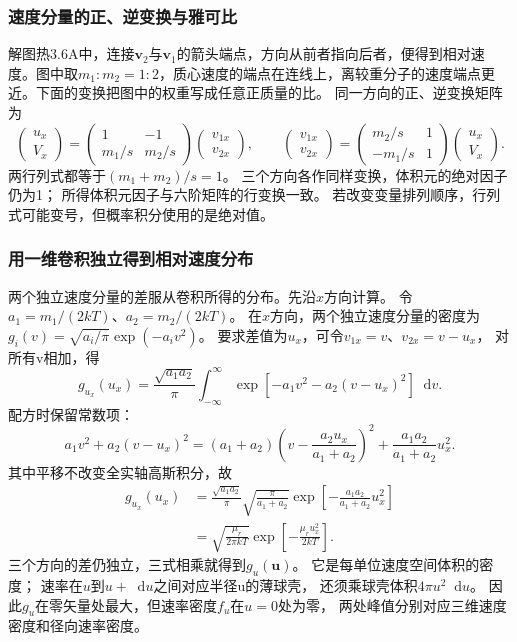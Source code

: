 \documentclass[UTF8,fontset=fandol,a4paper,11pt]{ctexart}
\newcommand{\dd}{\mathop{}\!\mathrm{d}}
\begin{document}
\subsubsection*{速度分量的正、逆变换与雅可比}
解图热3.6A中，连接$\bm v_2$与$\bm v_1$的箭头端点，方向从前者指向后者，便得到相对速度。图中取$m_1:m_2=1:2$，质心速度的端点在连线上，离较重分子的速度端点更近。下面的变换把图中的权重写成任意正质量的比。
同一方向的正、逆变换矩阵为
\[
\begin{pmatrix}u_x\\V_x\end{pmatrix}
=\begin{pmatrix}1&-1\\m_1/s&m_2/s\end{pmatrix}
\begin{pmatrix}v_{1x}\\v_{2x}\end{pmatrix},\qquad
\begin{pmatrix}v_{1x}\\v_{2x}\end{pmatrix}
=\begin{pmatrix}m_2/s&1\\-m_1/s&1\end{pmatrix}
\begin{pmatrix}u_x\\V_x\end{pmatrix}.
\]
两行列式都等于$(m_1+m_2)/s=1$。
三个方向各作同样变换，体积元的绝对因子仍为1；
所得体积元因子与六阶矩阵的行变换一致。
若改变变量排列顺序，行列式可能变号，但概率积分使用的是绝对值。

\subsubsection*{用一维卷积独立得到相对速度分布}
两个独立速度分量的差服从卷积所得的分布。先沿$x$方向计算。
令$a_1=m_1/(2kT)$、$a_2=m_2/(2kT)$。
在$x$方向，两个独立速度分量的密度为
$g_i(v)=\sqrt{a_i/\pi}\exp(-a_iv^2)$。
要求差值为$u_x$，可令$v_{1x}=v$、$v_{2x}=v-u_x$，
对所有v相加，得
\[
g_{u_x}(u_x)=\frac{\sqrt{a_1a_2}}{\pi}
\int_{-\infty}^\infty
\exp[-a_1v^2-a_2(v-u_x)^2]\dd v.
\]
配方时保留常数项：
\[
a_1v^2+a_2(v-u_x)^2
=(a_1+a_2)\left(v-\frac{a_2u_x}{a_1+a_2}\right)^2
+\frac{a_1a_2}{a_1+a_2}u_x^2.
\]
其中平移不改变全实轴高斯积分，故
\[
\begin{aligned}
g_{u_x}(u_x)
&=\frac{\sqrt{a_1a_2}}{\pi}
\sqrt{\frac{\pi}{a_1+a_2}}
\exp\left[-\frac{a_1a_2}{a_1+a_2}u_x^2\right]\\
&=\sqrt{\frac{\mu_r}{2\pi kT}}
\exp\left[-\frac{\mu_ru_x^2}{2kT}\right].
\end{aligned}
\]
三个方向的差仍独立，三式相乘就得到$g_u(\bm u)$。
它是每单位速度空间体积的密度；
速率在$u$到$u+\dd u$之间对应半径u的薄球壳，
还须乘球壳体积$4\pi u^2\dd u$。
因此$g_u$在零矢量处最大，但速率密度$f_u$在$u=0$处为零，
两处峰值分别对应三维速度密度和径向速率密度。
\end{document}
